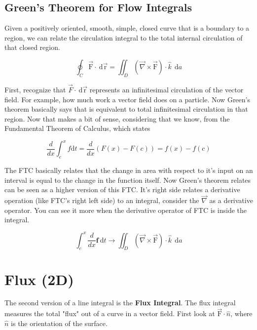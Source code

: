 \subsection{Green's Theorem for Flow Integrals}
{
	Given a positively oriented, smooth, simple, closed curve that is a boundary to a region, we can relate the 
	circulation integral to the total internal circulation of that closed region. 

	\begin{equation*}
		\oint_C \vec{\mathrm{F}} \cdot \:\mathrm{d}\vec{\mathrm{r}} = \iint_{D} {(\vec{\nabla} \times \vec{\mathrm{F}}) \cdot \hat{k} \:\:\mathrm{d}a}
	\end{equation*}
}

First, recognize that $\vec{F} \cdot \:\mathrm{d}\vec{\mathrm{r}}$ represents an infinitesimal circulation of the vector field. For example, how much work a vector field does on a particle. Now Green's theorem basically says that is equivalent to total infinitesimal circulation in that region. Now that makes a bit of sense, considering that we know, from the Fundamental Theorem of Calculus, which states 

\begin{equation*}
	\frac{d}{dx}\int_{c}^{x} f \mathrm{d}t = \frac{d}{dx} (F(x)-F(c)) = f(x) - f(c)	
\end{equation*} 

The FTC basically relates that the change in area with respect to it's input on an interval is equal to the change in the function itself. Now Green's theorem relates can be seen as a higher version of this FTC. It's right side relates a derivative operation (like FTC's right left side) to an integral, consider the $\vec{\nabla}$ as a derivative operator. You can see it more when the derivative operator of FTC is inside the integral. 

\begin{equation*}
	\int_{c}^{x}\frac{d}{dx} \textbf{f} \:\mathrm{d}t \to \iint_D (\vec{\nabla} \times \vec{\mathrm{F}})  \cdot 
	\hat{k} \:\:\mathrm{d}a
\end{equation*}

\section{Flux (2D)}

The second version of a line integral is the \textbf{Flux Integral}. The flux integral measures the total "flux" out of a curve in a vector field. First look at $\vec{\mathrm{F}} \cdot \hat{n}$, where $\hat{n}$ is the orientation of  the surface. 

